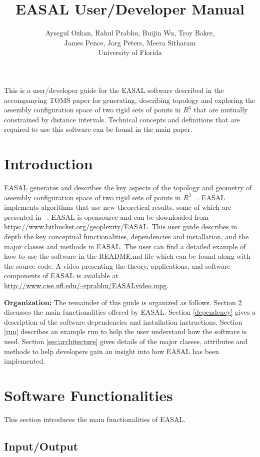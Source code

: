 \documentclass[10pt]{article}
\title{EASAL User/Developer Manual}
\author{Aysegul Ozkan, Rahul Prabhu, Ruijin Wu, Troy Baker, \\James Pence, Jorg
Peters, Meera Sitharam \\ University of Florida}
\begin{document}
\maketitle
This is a user/developer guide for the EASAL software described in
the accompanying TOMS paper for generating, describing topology and exploring the
assembly configuration space of two rigid sets of points in $R^3$ that are
mutually constrained by distance intervals. Technical concepts and definitions that are 
required to use this software can be found in the main paper.


\section{Introduction}
EASAL generates and describes the key aspects of the topology and geometry of
assembly configuration space of two rigid sets of points in $R^3$
~\cite{Sitharam:2012:EASAL, Ozkan2014MainEasal, Wu2014Virus}. EASAL implements
algorithms that use new theoretical results, some of which are presented in
~\cite{Ozkan2014MainEasal, SiGa:2010, Sitharam:2012:EASAL}.
EASAL is opensource and can be downloaded from
\url{https://www.bitbucket.org/geoplexity/EASAL}. This user guide describes in
depth the key conceptual functionalities, dependencies and installation, and
the major classes and methods in EASAL.  The user can find a detailed example
of how to use the software in the README.md file which can be found along with
the source code. A video presenting the theory, applications, and software
components of EASAL is available at
\url{http://www.cise.ufl.edu/~rprabhu/EASALvideo.mpg}.

\noindent\textbf{Organization:} The remainder of this guide is organized as
follows. Section \ref{functionalities} discusses the main functionalities
offered by EASAL. Section \ref{dependency} gives a description of the software
dependencies and installation instructions. Section \ref{run} describes an
example run to help the user understand how the software is used.
Section \ref{sec:architecture} gives details of the major classes,
attributes and methods to help developers gain an insight into how EASAL  has
been implemented.

\section{Software Functionalities}
\label{functionalities}
This section introduces the main functionalities of EASAL.


\subsection{Input/Output}
\end{document}

